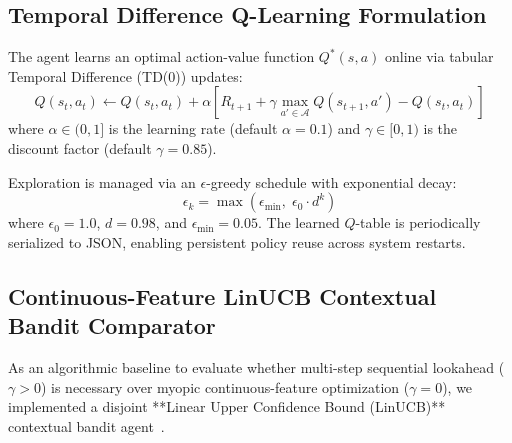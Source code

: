 \subsection{Temporal Difference Q-Learning Formulation}
The agent learns an optimal action-value function $Q^*(s, a)$ online via tabular Temporal Difference (TD(0)) updates:
\begin{equation}
    Q(s_t, a_t) \leftarrow Q(s_t, a_t) + \alpha \left[ R_{t+1} + \gamma \max_{a' \in \mathcal{A}} Q(s_{t+1}, a') - Q(s_t, a_t) \right]
\end{equation}
where $\alpha \in (0, 1]$ is the learning rate (default $\alpha = 0.1$) and $\gamma \in [0, 1)$ is the discount factor (default $\gamma = 0.85$). 

Exploration is managed via an $\epsilon$-greedy schedule with exponential decay:
\begin{equation}
    \epsilon_k = \max\left(\epsilon_{\min},\; \epsilon_0 \cdot d^k\right)
\end{equation}
where $\epsilon_0 = 1.0$, $d = 0.98$, and $\epsilon_{\min} = 0.05$. The learned $Q$-table is periodically serialized to JSON, enabling persistent policy reuse across system restarts.

\subsection{Continuous-Feature LinUCB Contextual Bandit Comparator}
As an algorithmic baseline to evaluate whether multi-step sequential lookahead ($\gamma > 0$) is necessary over myopic continuous-feature optimization ($\gamma = 0$), we implemented a disjoint **Linear Upper Confidence Bound (LinUCB)** contextual bandit agent~\cite{li2010contextual}.

